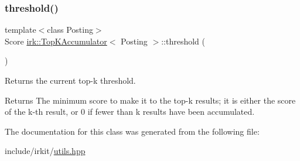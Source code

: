 \subsubsection{\texorpdfstring{threshold()}{threshold()}}
{\footnotesize\ttfamily template$<$class Posting$>$ \\
Score \mbox{\hyperlink{classirk_1_1TopKAccumulator}{irk\+::\+Top\+K\+Accumulator}}$<$ Posting $>$\+::threshold (\begin{DoxyParamCaption}{ }\end{DoxyParamCaption})\hspace{0.3cm}{\ttfamily [inline]}}



Returns the current top-\/k threshold. 

\begin{DoxyReturn}{Returns}
The minimum score to make it to the top-\/k results; it is either the score of the k-\/th result, or 0 if fewer than k results have been accumulated. 
\end{DoxyReturn}


The documentation for this class was generated from the following file\+:\begin{DoxyCompactItemize}
\item 
include/irkit/\mbox{\hyperlink{utils_8hpp}{utils.\+hpp}}\end{DoxyCompactItemize}
